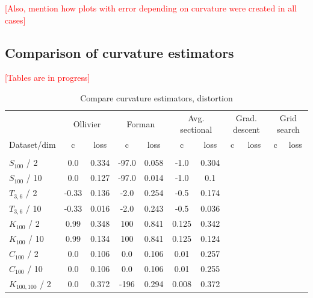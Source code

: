 \documentclass{article} %
\begin{document}
\textcolor{red}{[Also, mention how plots with error depending on curvature were created in all cases]}

\subsection{Comparison of curvature estimators}

\textcolor{red}{[Tables are in progress]}

\begin{table}[t]
\caption{Compare curvature estimators, distortion}
\label{tab:compare_distortion}
\begin{center}
\begin{tabular}{lcccccccccc}
&
\multicolumn{2}{c}{Ollivier} &
\multicolumn{2}{c}{Forman} &
\multicolumn{2}{c}{Avg. sectional} &
\multicolumn{2}{c}{Grad. descent} &
\multicolumn{2}{c}{Grid search} \\
Dataset/dim & c & loss  & c & loss  & c & loss  & c & loss  & c & loss \\
 \hline \\
$S_{100}$ / 2 &
0.0 & 0.334 & 
-97.0 & 0.058 & 
-1.0 & 0.304 &
& \\
$S_{100}$ / 10 &
0.0 & 0.127 & 
-97.0 & 0.014 & 
-1.0 & 0.1 & 
& \\
$T_{3,6}$ / 2 &
-0.33 & 0.136 & 
-2.0 & 0.254 & 
-0.5 & 0.174 & 
& \\
$T_{3,6}$ / 10 &
-0.33 & 0.016 & 
-2.0 & 0.243 & 
-0.5 & 0.036 & 
& \\
$K_{100}$ / 2 & 
0.99 & 0.348 & 
100 & 0.841 & 
0.125 & 0.342 & 
& \\
$K_{100}$ / 10 & 
0.99 & 0.134 & 
100 & 0.841 & 
0.125 & 0.124 & 
& \\
$C_{100}$ / 2 & 
0.0 & 0.106 & 
0.0 & 0.106 & 
0.01 & 0.257 &
& \\
$C_{100}$ / 10 & 
0.0 & 0.106 & 
0.0 & 0.106 & 
0.01 & 0.255 & 
& \\
$K_{100,100}$ / 2 &
0.0 & 0.372 & 
-196 & 0.294 & 
0.008 & 0.372 & 
& \\

\end{tabular}
\end{center}
\end{table}
\end{document}
